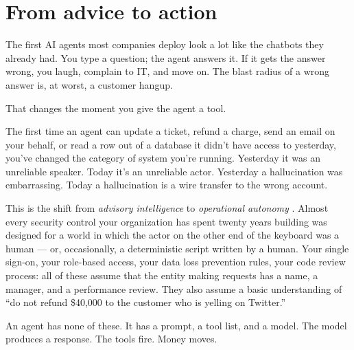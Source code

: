 \label{ch:20-hardening-05-why}

\starttwocol

\section{From advice to action}

The first AI agents most companies deploy look a lot like the chatbots they already had. You type a question; the agent answers it. If it gets the answer wrong, you laugh, complain to IT, and move on. The blast radius of a wrong answer is, at worst, a customer hangup.

That changes the moment you give the agent a tool.

The first time an agent can update a ticket, refund a charge, send an email on your behalf, or read a row out of a database it didn't have access to yesterday, you've changed the category of system you're running. Yesterday it was an unreliable speaker. Today it's an unreliable actor. Yesterday a hallucination was embarrassing. Today a hallucination is a wire transfer to the wrong account.

This is the shift from \textit{advisory intelligence} to \textit{operational autonomy} \citep{anthropic-building-agents-2024,openai-practical-agents-2025}. Almost every security control your organization has spent twenty years building was designed for a world in which the actor on the other end of the keyboard was a human --- or, occasionally, a deterministic script written by a human. Your single sign-on, your role-based access, your data loss prevention rules, your code review process: all of these assume that the entity making requests has a name, a manager, and a performance review. They also assume a basic understanding of ``do not refund \$40,000 to the customer who is yelling on Twitter.''

An agent has none of these. It has a prompt, a tool list, and a model. The model produces a response. The tools fire. Money moves.

